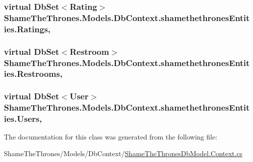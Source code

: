 \subsubsection[{\texorpdfstring{Ratings}{Ratings}}]{\setlength{\rightskip}{0pt plus 5cm}virtual Db\+Set$<${\bf Rating}$>$ Shame\+The\+Thrones.\+Models.\+Db\+Context.\+shamethethrones\+Entities.\+Ratings\hspace{0.3cm}{\ttfamily [get]}, {\ttfamily [set]}}\hypertarget{class_shame_the_thrones_1_1_models_1_1_db_context_1_1shamethethrones_entities_a8b81897ee475fbbac6f1db1160ecc2b0}{}\label{class_shame_the_thrones_1_1_models_1_1_db_context_1_1shamethethrones_entities_a8b81897ee475fbbac6f1db1160ecc2b0}
\subsubsection[{\texorpdfstring{Restrooms}{Restrooms}}]{\setlength{\rightskip}{0pt plus 5cm}virtual Db\+Set$<${\bf Restroom}$>$ Shame\+The\+Thrones.\+Models.\+Db\+Context.\+shamethethrones\+Entities.\+Restrooms\hspace{0.3cm}{\ttfamily [get]}, {\ttfamily [set]}}\hypertarget{class_shame_the_thrones_1_1_models_1_1_db_context_1_1shamethethrones_entities_ad2b61ca8b72548b5b99183fcfd93bb30}{}\label{class_shame_the_thrones_1_1_models_1_1_db_context_1_1shamethethrones_entities_ad2b61ca8b72548b5b99183fcfd93bb30}
\subsubsection[{\texorpdfstring{Users}{Users}}]{\setlength{\rightskip}{0pt plus 5cm}virtual Db\+Set$<${\bf User}$>$ Shame\+The\+Thrones.\+Models.\+Db\+Context.\+shamethethrones\+Entities.\+Users\hspace{0.3cm}{\ttfamily [get]}, {\ttfamily [set]}}\hypertarget{class_shame_the_thrones_1_1_models_1_1_db_context_1_1shamethethrones_entities_a1c09a1efc2b65525227afecfee53bd65}{}\label{class_shame_the_thrones_1_1_models_1_1_db_context_1_1shamethethrones_entities_a1c09a1efc2b65525227afecfee53bd65}


The documentation for this class was generated from the following file\+:\begin{DoxyCompactItemize}
\item 
Shame\+The\+Thrones/\+Models/\+Db\+Context/\hyperlink{_shame_the_thrones_db_model_8_context_8cs}{Shame\+The\+Thrones\+Db\+Model.\+Context.\+cs}\end{DoxyCompactItemize}

